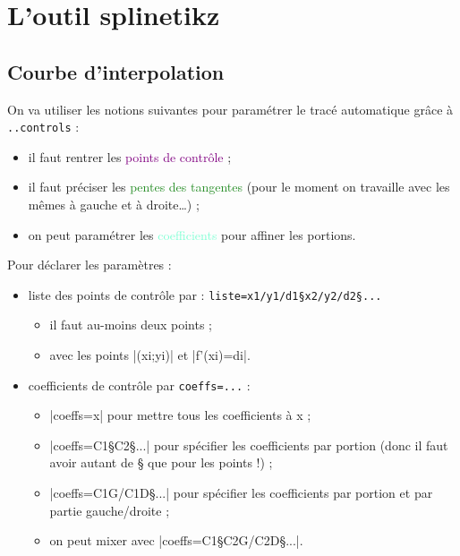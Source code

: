 \documentclass{article}
\begin{document}
\newpage

\section{L'outil \og splinetikz \fg}

\subsection{Courbe d'interpolation}

On va utiliser les notions suivantes pour paramétrer le tracé \og automatique \fg{} grâce à  \verb|..controls| :
%
\begin{itemize}
	\item il faut rentrer les \textcolor{purple}{\textsf{points de contrôle}} ;
	\item il faut préciser les \textcolor{ForestGreen}{\textsf{pentes des tangentes}} (pour le moment on travaille avec les mêmes à gauche et à droite\ldots) ;
	\item on peut paramétrer les \textcolor{Aquamarine}{\textsf{coefficients}} pour \og affiner \fg{} les portions.
\end{itemize}

\medskip

Pour déclarer les paramètres :
%
\begin{itemize}
	\item liste des points de contrôle par : \verb|liste=x1/y1/d1§x2/y2/d2§...|
	\begin{itemize}
		\item il faut au-moins deux points ;
		\item avec les points \pverb|(xi;yi)| et \vverb|f'(xi)=di|.
	\end{itemize}
	\item coefficients de contrôle par \verb|coeffs=...| :
	\begin{itemize}
		\item \averb|coeffs=x| pour mettre tous les coefficients à x ;
		\item \averb|coeffs=C1§C2§...| pour spécifier les coefficients par portion (donc il faut avoir autant de § que pour les points !) ;
		\item \averb|coeffs=C1G/C1D§...| pour spécifier les coefficients par portion et par partie gauche/droite ;
		\item on peut mixer avec \averb|coeffs=C1§C2G/C2D§...|.
	\end{itemize}
\end{itemize}
\end{document}
